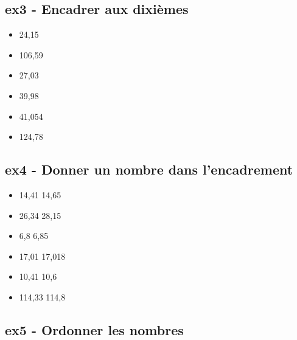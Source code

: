 \vspace{1cm}

\begin{multicols}{2} 
\subsection*{ex3 - Encadrer aux dixièmes}

\begin{itemize}[label={$\bullet$}]
  \item \noindent\makebox[3cm]{\dotfill} 24,15 \noindent\makebox[3cm]{\dotfill}
  \item \noindent\makebox[3cm]{\dotfill} 106,59 \noindent\makebox[3cm]{\dotfill}
  \item \noindent\makebox[3cm]{\dotfill} 27,03 \noindent\makebox[3cm]{\dotfill}
  \item \noindent\makebox[3cm]{\dotfill} 39,98 \noindent\makebox[3cm]{\dotfill}
  \item \noindent\makebox[3cm]{\dotfill} 41,054 \noindent\makebox[3cm]{\dotfill}
  \item \noindent\makebox[3cm]{\dotfill} 124,78 \noindent\makebox[3cm]{\dotfill}
\end{itemize} 

\subsection*{ex4 - Donner un nombre dans l'encadrement}

\begin{itemize}[label={$\bullet$}]
  \item 14,41 \noindent\makebox[3cm]{\dotfill} 14,65 
  \item 26,34 \noindent\makebox[3cm]{\dotfill} 28,15 
  \item 6,8 \noindent\makebox[3cm]{\dotfill} 6,85 
  \item 17,01 \noindent\makebox[3cm]{\dotfill} 17,018 
  \item 10,41 \noindent\makebox[3cm]{\dotfill} 10,6 
  \item 114,33 \noindent\makebox[3cm]{\dotfill} 114,8 
\end{itemize} 

\end{multicols}

\vspace{1cm}

\subsection*{ex5 - Ordonner les nombres} 

